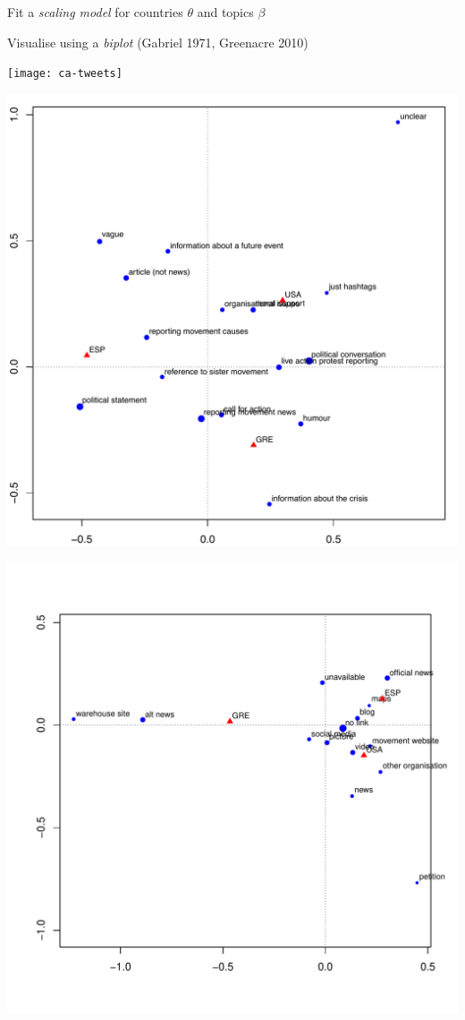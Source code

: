 \documentclass{mediumfoils}
\newcommand{\mkgrey}[1]{{\color{pale}#1}}
\begin{document}
Fit a \textit{scaling model} for countries $\theta$ and topics $\beta$

Visualise using a \textit{biplot} \mkgrey{(Gabriel 1971, Greenacre 2010)}

 
\newpage

\centerline{\texttt{[image: ca-tweets]}}
\centerline{\includegraphics[scale=1]{purpose-by-country-ca2}}
\centerline{\includegraphics[scale=1]{linktarget-by-country-ca}}
\end{document}
